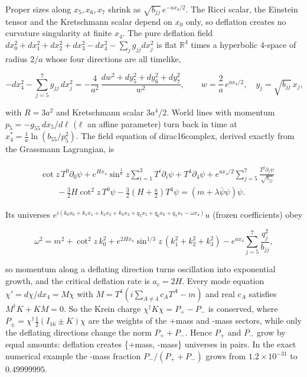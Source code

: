 \documentclass[10pt]{article}
\makeatletter
\newcommand\keepnext{\par\nopagebreak\@nobreaktrue\everypar{\@nobreakfalse\everypar{}}}
\makeatother
\begin{document}
Proper sizes along $x_5, x_6, x_7$ shrink as $\sqrt{b_{jj}}\,e^{-ax_4/2}$. The Ricci scalar, the Einstein tensor and the Kretschmann scalar depend on $x_0$ only, so deflation creates no curvature singularity at finite $x_4$. The pure deflation field $dx_0^2 + dx_1^2 + dx_2^2 + dx_3^2 - dx_4^2 - \sum_j g_{jj}dx_j^2$ is flat $\mathbb R^4$ times a hyperbolic 4-space of radius $2/a$ whose four directions are all timelike,\keepnext


\[
-dx_4^2 - \sum_{j=5}^{7}g_{jj}\,dx_j^2 = -\frac{4}{a^2}\,\frac{dw^2 + dy_5^2 + dy_6^2 + dy_7^2}{w^2}, \qquad w = \frac2a\,e^{ax_4/2},\quad y_j = \sqrt{b_{jj}}\,x_j ,
\]

with $R = 3a^2$ and Kretschmann scalar $3a^4/2$. World lines with momentum $p_5 = -g_{55}\,dx_5/d\ell$ ($\ell$ an affine parameter) turn back in time at $x_4^* = \frac1a\ln(b_{55}/p_5^2)$. The field equation of dirac16complex, derived exactly from the Grassmann Lagrangian, is\keepnext


\[
\begin{aligned}
&\cot z\,T^0\partial_0\psi + e^{Hx_4}\sin^{\frac16}z\sum_{i=1}^{3}T^i\partial_i\psi + T^4\partial_4\psi + e^{ax_4/2}\sum_{j=5}^{7}\frac{T^j\partial_j\psi}{\sqrt{b_{jj}}} \\
&\qquad - \frac32H\cot^2 z\,T^0\psi - \frac32\left(H + \frac a2\right)T^4\psi = (m + \lambda\bar\psi\psi)\psi .
\end{aligned}
\]

Its universes $e^{i(k_0x_0 + k_1x_1 + k_2x_2 + k_3x_3 + q_5x_5 + q_6x_6 + q_7x_7 - \omega x_4)}u$ (frozen coefficients) obey\keepnext


\[
\omega^2 = m^2 + \cot^2 z\,k_0^2 + e^{2Hx_4}\sin^{1/3}z\,(k_1^2 + k_2^2 + k_3^2) - e^{ax_4}\sum_{j=5}^{7}\frac{q_j^2}{b_{jj}} ,
\]

so momentum along a deflating direction turns oscillation into exponential growth, and the critical deflation rate is $a_c = 2H$. Every mode equation $\chi' = d\chi/dx_4 = M\chi$ with $M = T^4(i\sum_{A\ne4}c_AT^A - m)$ and real $c_A$ satisfies $M^\dagger K + KM = 0$. So the Krein charge $\chi^\dagger K\chi = P_+ - P_-$ is conserved, where $P_\pm = \chi^\dagger\frac12(I_{16} \pm K)\chi$ are the weights of the +mass and -mass sectors, while only the deflating directions change the norm $P_+ + P_-$. Hence $P_+$ and $P_-$ grow by equal amounts: deflation creates \{+mass, -mass\} universes in pairs. In the exact numerical example the -mass fraction $P_-/(P_+ + P_-)$ grows from $1.2\times10^{-31}$ to $0.49999995$.
\end{document}
